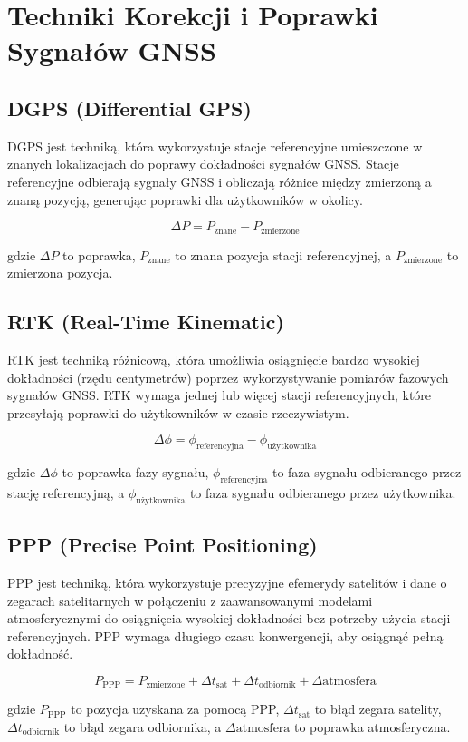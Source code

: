 \section{Techniki Korekcji i Poprawki Sygnałów GNSS}

\subsection{DGPS (Differential GPS)}
DGPS jest techniką, która wykorzystuje stacje referencyjne umieszczone w znanych lokalizacjach do poprawy dokładności sygnałów GNSS. Stacje referencyjne odbierają sygnały GNSS i obliczają różnice między zmierzoną a znaną pozycją, generując poprawki dla użytkowników w okolicy.

\[
\Delta P = P_{\text{znane}} - P_{\text{zmierzone}}
\]

gdzie \( \Delta P \) to poprawka, \( P_{\text{znane}} \) to znana pozycja stacji referencyjnej, a \( P_{\text{zmierzone}} \) to zmierzona pozycja.

\subsection{RTK (Real-Time Kinematic)}
RTK jest techniką różnicową, która umożliwia osiągnięcie bardzo wysokiej dokładności (rzędu centymetrów) poprzez wykorzystywanie pomiarów fazowych sygnałów GNSS. RTK wymaga jednej lub więcej stacji referencyjnych, które przesyłają poprawki do użytkowników w czasie rzeczywistym.

\[
\Delta \phi = \phi_{\text{referencyjna}} - \phi_{\text{użytkownika}}
\]

gdzie \( \Delta \phi \) to poprawka fazy sygnału, \( \phi_{\text{referencyjna}} \) to faza sygnału odbieranego przez stację referencyjną, a \( \phi_{\text{użytkownika}} \) to faza sygnału odbieranego przez użytkownika.

\subsection{PPP (Precise Point Positioning)}
PPP jest techniką, która wykorzystuje precyzyjne efemerydy satelitów i dane o zegarach satelitarnych w połączeniu z zaawansowanymi modelami atmosferycznymi do osiągnięcia wysokiej dokładności bez potrzeby użycia stacji referencyjnych. PPP wymaga długiego czasu konwergencji, aby osiągnąć pełną dokładność.

\[
P_{\text{PPP}} = P_{\text{zmierzone}} + \Delta t_{\text{sat}} + \Delta t_{\text{odbiornik}} + \Delta \text{atmosfera}
\]

gdzie \( P_{\text{PPP}} \) to pozycja uzyskana za pomocą PPP, \( \Delta t_{\text{sat}} \) to błąd zegara satelity, \( \Delta t_{\text{odbiornik}} \) to błąd zegara odbiornika, a \( \Delta \text{atmosfera} \) to poprawka atmosferyczna.
